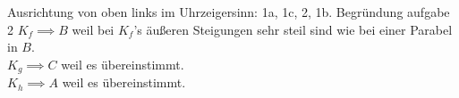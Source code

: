 \documentclass{book}
\begin{document}




Ausrichtung von oben links im Uhrzeigersinn: 1a, 1c, 2, 1b.
Begründung aufgabe 2
$K_f\implies B$ weil bei $K_f$'s äußeren Steigungen sehr steil sind wie bei
einer Parabel in $B$.\\
$K_g\implies C$ weil es übereinstimmt.\\
$K_h\implies A$ weil es übereinstimmt.\\

\end{document}
